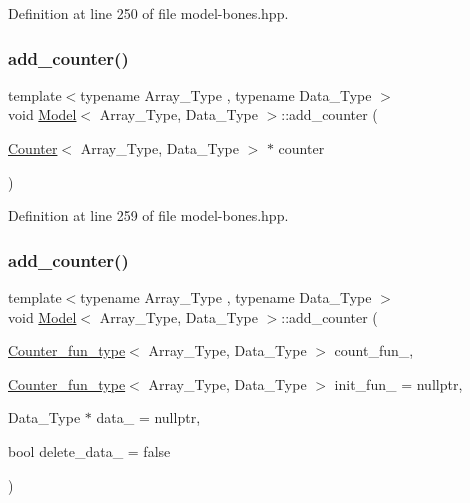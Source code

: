 Definition at line 250 of file model-\/bones.\+hpp.

\mbox{\label{class_model_a05265a5a9a12109a4a2b56b3bb42015e}} 
\subsubsection{\texorpdfstring{add\+\_\+counter()}{add\_counter()}\hspace{0.1cm}{\footnotesize\ttfamily [2/3]}}
{\footnotesize\ttfamily template$<$typename Array\+\_\+\+Type , typename Data\+\_\+\+Type $>$ \\
void \hyperlink{class_model}{Model}$<$ Array\+\_\+\+Type, Data\+\_\+\+Type $>$\+::add\+\_\+counter (\begin{DoxyParamCaption}\item[{\hyperlink{class_counter}{Counter}$<$ Array\+\_\+\+Type, Data\+\_\+\+Type $>$ $\ast$}]{counter }\end{DoxyParamCaption})\hspace{0.3cm}{\ttfamily [inline]}}



Definition at line 259 of file model-\/bones.\+hpp.

\mbox{\label{class_model_a950b0429e07047d4774eac60f7c335f2}} 
\subsubsection{\texorpdfstring{add\+\_\+counter()}{add\_counter()}\hspace{0.1cm}{\footnotesize\ttfamily [3/3]}}
{\footnotesize\ttfamily template$<$typename Array\+\_\+\+Type , typename Data\+\_\+\+Type $>$ \\
void \hyperlink{class_model}{Model}$<$ Array\+\_\+\+Type, Data\+\_\+\+Type $>$\+::add\+\_\+counter (\begin{DoxyParamCaption}\item[{\hyperlink{typedefs_8hpp_ac0160f52f564dea3ac033b374cffbfe7}{Counter\+\_\+fun\+\_\+type}$<$ Array\+\_\+\+Type, Data\+\_\+\+Type $>$}]{count\+\_\+fun\+\_\+,  }\item[{\hyperlink{typedefs_8hpp_ac0160f52f564dea3ac033b374cffbfe7}{Counter\+\_\+fun\+\_\+type}$<$ Array\+\_\+\+Type, Data\+\_\+\+Type $>$}]{init\+\_\+fun\+\_\+ = {\ttfamily nullptr},  }\item[{Data\+\_\+\+Type $\ast$}]{data\+\_\+ = {\ttfamily nullptr},  }\item[{bool}]{delete\+\_\+data\+\_\+ = {\ttfamily false} }\end{DoxyParamCaption})\hspace{0.3cm}{\ttfamily [inline]}}



